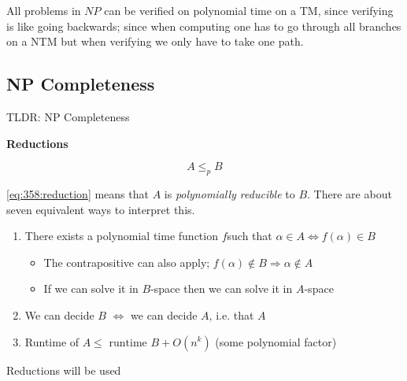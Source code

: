 \documentclass[../notes.tex]{subfiles}
\begin{document}
\begin{theorem}
	All problems in $ NP $ can be verified on polynomial time on a TM, since verifying is like going backwards; since when computing one has to go through all branches on a NTM but when verifying we only have to take one path. 
\end{theorem}



\subsection{NP Completeness}

\begin{blockquote}
	TLDR: NP Completeness 
\end{blockquote}










\begin{definition}
	\textbf{Reductions} 


	\begin{equation}
		A \leq_p B
		\label{eq:358:reduction}
	\end{equation}

	\eqref{eq:358:reduction} means that $ A $ is \textit{polynomially reducible} to $ B $.
	There are about seven equivalent ways to interpret this.

	\begin{enumerate}
		\item There exists a polynomial time function $ f $such that $ \alpha \in A \Leftrightarrow f(\alpha) \in B $
			\begin{itemize}
				\item The contrapositive can also apply; $ f(\alpha) \notin B \Rightarrow \alpha \notin A $
				\item If we can solve it in $ B $-space then we can solve it in $ A $-space
			\end{itemize}
		\item We can decide $ B $ $ \Leftrightarrow $ we can decide $ A $, i.e. that $ A $ 

		\item Runtime of $ A  \le \text{ runtime } B + O(n^k)$ (some polynomial factor)
	\end{enumerate}

	Reductions will be used



\end{definition}
\end{document}
